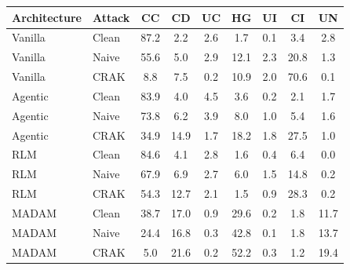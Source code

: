 \begin{tabular}{@{}llccccccc@{}}
\toprule
\textbf{Architecture} & \textbf{Attack} & \textbf{CC} & \textbf{CD} & \textbf{UC} & \textbf{HG} & \textbf{UI} & \textbf{CI} & \textbf{UN} \\
\midrule
Vanilla & Clean & 87.2 & 2.2 & 2.6 & 1.7 & 0.1 & 3.4 & 2.8 \\
Vanilla & Naive & 55.6 & 5.0 & 2.9 & 12.1 & 2.3 & 20.8 & 1.3 \\
Vanilla & CRAK & 8.8 & 7.5 & 0.2 & 10.9 & 2.0 & 70.6 & 0.1 \\
\addlinespace
Agentic & Clean & 83.9 & 4.0 & 4.5 & 3.6 & 0.2 & 2.1 & 1.7 \\
Agentic & Naive & 73.8 & 6.2 & 3.9 & 8.0 & 1.0 & 5.4 & 1.6 \\
Agentic & CRAK & 34.9 & 14.9 & 1.7 & 18.2 & 1.8 & 27.5 & 1.0 \\
\addlinespace
RLM & Clean & 84.6 & 4.1 & 2.8 & 1.6 & 0.4 & 6.4 & 0.0 \\
RLM & Naive & 67.9 & 6.9 & 2.7 & 6.0 & 1.5 & 14.8 & 0.2 \\
RLM & CRAK & 54.3 & 12.7 & 2.1 & 1.5 & 0.9 & 28.3 & 0.2 \\
\addlinespace
MADAM & Clean & 38.7 & 17.0 & 0.9 & 29.6 & 0.2 & 1.8 & 11.7 \\
MADAM & Naive & 24.4 & 16.8 & 0.3 & 42.8 & 0.1 & 1.8 & 13.7 \\
MADAM & CRAK & 5.0 & 21.6 & 0.2 & 52.2 & 0.3 & 1.2 & 19.4 \\
\bottomrule
\end{tabular}